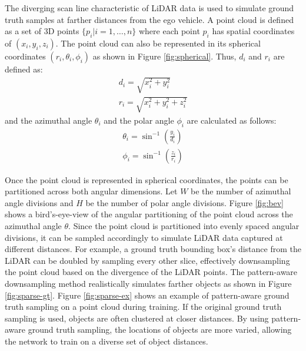 \documentclass[10pt, conference, compsocconf]{IEEEtran}
\begin{document}
The diverging scan line characteristic of LiDAR data is used to simulate ground truth samples at farther distances from the ego vehicle. A point cloud is defined as a set of 3D points $\{p_i | i=1,\dots,n\}$ where each point $p_i$ has spatial coordinates of $(x_i, y_i, z_i)$. The point cloud can also be represented in its spherical coordinates $(r_i, \theta_i, \phi_i)$ as shown in Figure \ref{fig:spherical}. Thus, $d_i$ and $r_i$ are defined as:
\begin{align}
    d_i = \sqrt{x_i^2 + y_i^2}\\
    r_i = \sqrt{x_i^2 + y_i^2 + z_i^2}
\end{align}
and the azimuthal angle $\theta_i$ and the polar angle $\phi_i$ are calculated as follows:
\begin{align}
    \theta_i = \sin^{-1}\left(\frac{y_i}{d_i}\right)\\
    \phi_i = \sin^{-1}\left(\frac{z_i}{r_i}\right)
\end{align}

Once the point cloud is represented in spherical coordinates, the points can be partitioned across both angular dimensions. Let $W$ be the number of azimuthal angle divisions and $H$ be the number of polar angle divisions. Figure \ref{fig:bev} shows a bird's-eye-view of the angular partitioning of the point cloud across the azimuthal angle $\theta$. Since the point cloud is partitioned into evenly spaced angular divisions, it can be sampled accordingly to simulate LiDAR data captured at different distances. For example, a ground truth bounding box's distance from the LiDAR can be doubled by sampling every other slice, effectively downsampling the point cloud based on the divergence of the LiDAR points. The pattern-aware downsampling method realistically simulates farther objects as shown in Figure \ref{fig:sparse-gt}. Figure \ref{fig:sparse-ex} shows an example of pattern-aware ground truth sampling on a point cloud during training. If the original ground truth sampling is used, objects are often clustered at closer distances. By using pattern-aware ground truth sampling, the locations of objects are more varied, allowing the network to train on a diverse set of object distances.
\end{document}
